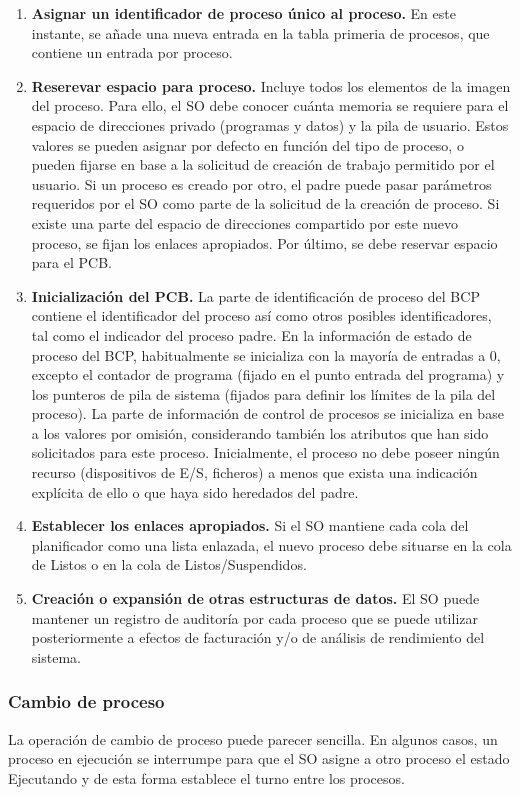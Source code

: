 \documentclass{article}
\begin{document}
				\begin{enumerate}
				\item \textbf{Asignar un identificador de proceso único al proceso.} En este instante, se añade una nueva entrada en la tabla primeria de procesos, que contiene un entrada por proceso.
				\item \textbf{Reserevar espacio para proceso.} Incluye todos los elementos de la imagen del proceso. Para ello, el SO debe conocer cuánta memoria se requiere para el espacio de direcciones privado (programas y datos) y la pila de usuario. Estos valores se pueden asignar por defecto en función del tipo de proceso, o pueden fijarse en base a la solicitud de creación de trabajo permitido por el usuario. Si un proceso es creado por otro, el padre puede pasar parámetros requeridos por el SO como parte de la solicitud de la creación de proceso. Si existe una parte del espacio de direcciones compartido por este nuevo proceso, se fijan los enlaces apropiados. Por último, se debe reservar espacio para el PCB.
				\item \textbf{Inicialización del PCB.} La parte de identificación de proceso del BCP contiene el identificador del proceso así como otros posibles identificadores, tal como el indicador del proceso padre. En la información de estado de proceso del BCP, habitualmente se inicializa con la mayoría de entradas a 0, excepto el contador de programa (fijado en el punto entrada del programa) y los punteros de pila de sistema (fijados para definir los límites de la pila del proceso). La parte de información de control de procesos se inicializa en base a los valores por omisión, considerando también los atributos que han sido solicitados para este proceso. Inicialmente, el proceso no debe poseer ningún recurso (dispositivos de E/S, ficheros) a menos que exista una indicación explícita de ello o que haya sido heredados del padre.
				\item \textbf{Establecer los enlaces apropiados.} Si el SO mantiene cada cola del planificador como una lista enlazada, el nuevo proceso debe situarse en la cola de Listos o en la cola de Listos/Suspendidos.
				\item \textbf{Creación o expansión de otras estructuras de datos.} El SO puede mantener un registro de auditoría por cada proceso que se puede utilizar posteriormente a efectos de facturación y/o de análisis de rendimiento del sistema.
				\end{enumerate}
				
			\subsubsection{Cambio de proceso}
				La operación de cambio de proceso puede parecer sencilla. En algunos casos, un proceso en ejecución se interrumpe para que el SO asigne a otro proceso el estado Ejecutando y de esta forma establece el turno entre los procesos. \\
				
\end{document}
